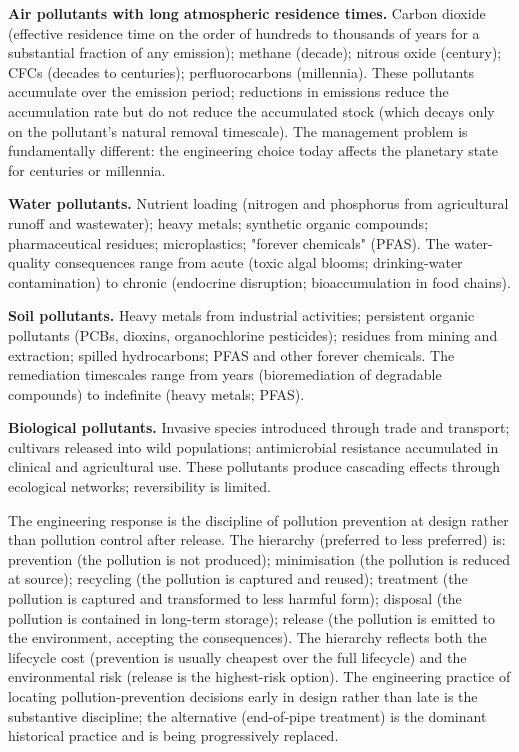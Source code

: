 \textbf{Air pollutants with long atmospheric residence times.} Carbon dioxide (effective residence time on the order of hundreds to thousands of years for a substantial fraction of any emission); methane (decade); nitrous oxide (century); CFCs (decades to centuries); perfluorocarbons (millennia). These pollutants accumulate over the emission period; reductions in emissions reduce the accumulation rate but do not reduce the accumulated stock (which decays only on the pollutant's natural removal timescale). The management problem is fundamentally different: the engineering choice today affects the planetary state for centuries or millennia.

\textbf{Water pollutants.} Nutrient loading (nitrogen and phosphorus from agricultural runoff and wastewater); heavy metals; synthetic organic compounds; pharmaceutical residues; microplastics; "forever chemicals" (PFAS). The water-quality consequences range from acute (toxic algal blooms; drinking-water contamination) to chronic (endocrine disruption; bioaccumulation in food chains).

\textbf{Soil pollutants.} Heavy metals from industrial activities; persistent organic pollutants (PCBs, dioxins, organochlorine pesticides); residues from mining and extraction; spilled hydrocarbons; PFAS and other forever chemicals. The remediation timescales range from years (bioremediation of degradable compounds) to indefinite (heavy metals; PFAS).

\textbf{Biological pollutants.} Invasive species introduced through trade and transport; cultivars released into wild populations; antimicrobial resistance accumulated in clinical and agricultural use. These pollutants produce cascading effects through ecological networks; reversibility is limited.

The engineering response is the discipline of pollution prevention at design rather than pollution control after release. The hierarchy (preferred to less preferred) is: prevention (the pollution is not produced); minimisation (the pollution is reduced at source); recycling (the pollution is captured and reused); treatment (the pollution is captured and transformed to less harmful form); disposal (the pollution is contained in long-term storage); release (the pollution is emitted to the environment, accepting the consequences). The hierarchy reflects both the lifecycle cost (prevention is usually cheapest over the full lifecycle) and the environmental risk (release is the highest-risk option). The engineering practice of locating pollution-prevention decisions early in design rather than late is the substantive discipline; the alternative (end-of-pipe treatment) is the dominant historical practice and is being progressively replaced.

